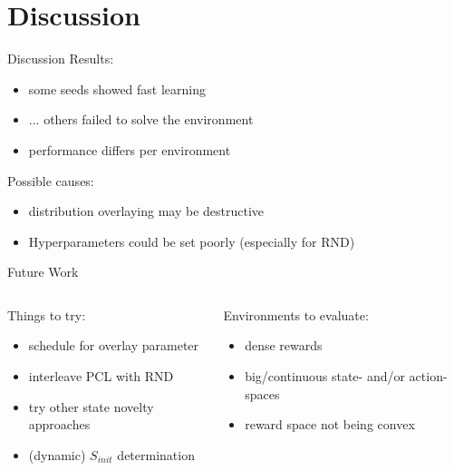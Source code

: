 \documentclass[aspectratio=169]{beamer}
\begin{document}
\section{Discussion}
\begin{frame}{Discussion}
  Results:
  \begin{itemize}
    \item some seeds showed fast learning
    \item ... others failed to solve the environment
    \item performance differs per environment
  \end{itemize}
  \vfill
  Possible causes:
  \begin{itemize}
    \item distribution overlaying may be destructive
    \item Hyperparameters could be set poorly (especially for RND)
  \end{itemize}
\end{frame}

\begin{frame}{Future Work}
  \begin{columns}[T]
    \begin{column}{0.48\textwidth}
      Things to try:
      \begin{itemize}
        \item schedule for overlay parameter
        \item interleave PCL with RND
        \item try other state novelty approaches
        \item (dynamic) $S_{init}$ determination
      \end{itemize}
    \end{column}
    \begin{column}{0.48\textwidth}
      Environments to evaluate:
      \begin{itemize}
        \item dense rewards
        \item big/continuous state- and/or action-spaces
        \item reward space not being convex
      \end{itemize}
    \end{column}
  \end{columns}

\end{frame}
\end{document}
